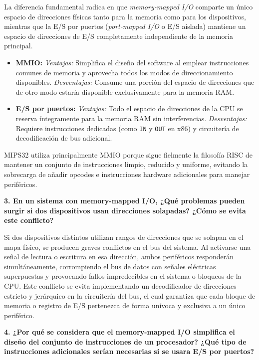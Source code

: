 \documentclass[11pt,a4paper]{article}
\begin{document}
\vspace{0.5cm}
La diferencia fundamental radica en que \textit{memory-mapped I/O} comparte un único espacio de direcciones físicas tanto para la memoria como para los dispositivos, mientras que la E/S por puertos (\textit{port-mapped I/O} o E/S aislada) mantiene un espacio de direcciones de E/S completamente independiente de la memoria principal. 
\begin{itemize}
    \item \textbf{MMIO:} \textit{Ventajas:} Simplifica el diseño del software al emplear instrucciones comunes de memoria y aprovecha todos los modos de direccionamiento disponibles. \textit{Desventajas:} Consume una porción del espacio de direcciones que de otro modo estaría disponible exclusivamente para la memoria RAM.
    \item \textbf{E/S por puertos:} \textit{Ventajas:} Todo el espacio de direcciones de la CPU se reserva íntegramente para la memoria RAM sin interferencias. \textit{Desventajas:} Requiere instrucciones dedicadas (como \texttt{IN} y \texttt{OUT} en x86) y circuitería de decodificación de bus adicional.
\end{itemize}
MIPS32 utiliza principalmente MMIO porque sigue fielmente la filosofía RISC de mantener un conjunto de instrucciones limpio, reducido y uniforme, evitando la sobrecarga de añadir opcodes e instrucciones hardware adicionales para manejar periféricos.

\vspace{0.4cm}
\noindent\textbf{3. En un sistema con memory-mapped I/O, ¿Qué problemas pueden surgir si dos dispositivos usan direcciones solapadas? ¿Cómo se evita este conflicto?}

\vspace{0.5cm}
Si dos dispositivos distintos utilizan rangos de direcciones que se solapan en el mapa físico, se producen graves conflictos en el bus del sistema. Al activarse una señal de lectura o escritura en esa dirección, ambos periféricos responderán simultáneamente, corrompiendo el bus de datos con señales eléctricas superpuestas y provocando fallos impredecibles en el sistema o bloqueos de la CPU. Este conflicto se evita implementando un decodificador de direcciones estricto y jerárquico en la circuitería del bus, el cual garantiza que cada bloque de memoria o registro de E/S pertenezca de forma unívoca y exclusiva a un único periférico.

\vspace{0.4cm}
\noindent\textbf{4. ¿Por qué se considera que el memory-mapped I/O simplifica el diseño del conjunto de instrucciones de un procesador? ¿Qué tipo de instrucciones adicionales serían necesarias si se usara E/S por puertos?}
\end{document}
